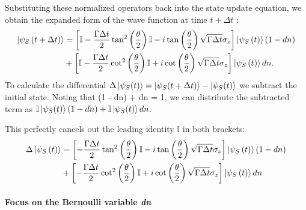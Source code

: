 \documentclass[a4paper,12pt]{article}
\begin{document}
Substituting these normalized operators back into the state update equation, we obtain the expanded form of the wave function at time $ t + \Delta t $ :
\begin{align}
	\ket{\psi_{S}\left(t + \Delta t \right)} &= \left[ \mathbb{I} - \frac{\Gamma\Delta t}{2} \tan^{2}\left(\frac{\theta}{2}\right) \mathbb{I} - i \tan\left(\frac{\theta}{2}\right) \sqrt{\Gamma \Delta t} \sigma_{z} \right] \ket{\psi_{S}\left(t\right)} (1 - dn) \notag \\
	&+ \left[ \mathbb{I} - \frac{\Gamma\Delta t}{2} \cot^{2}\left(\frac{\theta}{2}\right) \mathbb{I} + i \cot\left(\frac{\theta}{2}\right) \sqrt{\Gamma \Delta t} \sigma_{z} \right] \ket{\psi_{S}\left(t\right)} dn.
	\label{eq:psi_t_plus_dt_expanded}
\end{align}
To calculate the differential $ \Delta\ket{\psi_{S}(t)} = \ket{\psi_{S}(t + \Delta t)} - \ket{\psi_{S}(t)}$ we subtract the initial state. Noting that (1 - dn) + dn = 1, we can distribute  the subtracted term as $ \mathbb{I}\ket{\psi_{S}(t)}(1 - dn) + \mathbb{I}\ket{\psi_{S}(t)}dn$. 

This perfectly cancels out the leading identity $\mathbb{I}$ in both brackets:
\begin{align}
	\Delta \ket{\psi_{S}\left(t\right)} &= \left[ - \frac{\Gamma\Delta t}{2} \tan^{2}\left(\frac{\theta}{2}\right) \mathbb{I} - i \tan\left(\frac{\theta}{2}\right) \sqrt{\Gamma \Delta t} \sigma_{z} \right] \ket{\psi_{S}\left(t\right)} (1 - dn) \notag \\
	&+ \left[ - \frac{\Gamma\Delta t}{2} \cot^{2}\left(\frac{\theta}{2}\right) \mathbb{I} + i \cot\left(\frac{\theta}{2}\right) \sqrt{\Gamma \Delta t} \sigma_{z} \right] \ket{\psi_{S}\left(t\right)} dn
	\label{eq:dpsi_general}
\end{align}

\paragraph{Focus on the Bernoulli variable \textit{dn}}
\end{document}
